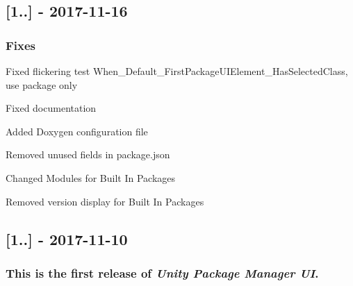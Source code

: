 \subsection*{\mbox{[}1..\mbox{]} -\/ 2017-\/11-\/16}

\subsubsection*{Fixes}


\begin{DoxyItemize}
\item Fixed flickering test When\+\_\+\+Default\+\_\+\+First\+Package\+U\+I\+Element\+\_\+\+Has\+Selected\+Class, use package only
\item Fixed documentation
\item Added Doxygen configuration file
\item Removed unused fields in package.\+json
\item Changed \textquotesingle{}Modules\textquotesingle{} for \textquotesingle{}Built In Packages\textquotesingle{}
\item Removed version display for Built In Packages
\end{DoxyItemize}

\subsection*{\mbox{[}1..\mbox{]} -\/ 2017-\/11-\/10}

\subsubsection*{This is the first release of {\itshape Unity Package Manager UI}.}